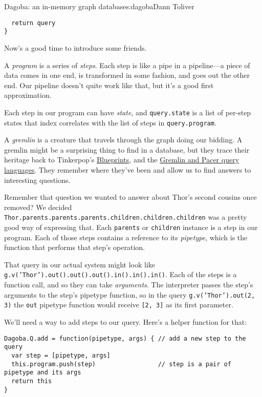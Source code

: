 \begin{aosachapter}{Dagoba: an in-memory graph database}{s:dagoba}{Dann Toliver}
\begin{verbatim}
  return query
}
\end{verbatim}

Now's a good time to introduce some friends.

A \emph{program} is a series of \emph{steps}. Each step is like a pipe
in a pipeline---a piece of data comes in one end, is transformed in some
fashion, and goes out the other end. Our pipeline doesn't quite work
like that, but it's a good first approximation.

Each step in our program can have \emph{state}, and \texttt{query.state}
is a list of per-step states that index correlates with the list of
steps in \texttt{query.program}.

A \emph{gremlin} is a creature that travels through the graph doing our
bidding. A gremlin might be a surprising thing to find in a database,
but they trace their heritage back to Tinkerpop's
\href{http://euranova.eu/upl_docs/publications/an-empirical-comparison-of-graph-databases.pdf}{Blueprints},
and the
\href{http://edbt.org/Proceedings/2013-Genova/papers/workshops/a29-holzschuher.pdf}{Gremlin
and Pacer query languages}. They remember where they've been and allow
us to find answers to interesting questions.

Remember that question we wanted to answer about Thor's second cousins
once removed? We decided
\texttt{Thor.parents.parents.parents.children.children.children} was a
pretty good way of expressing that. Each \texttt{parents} or
\texttt{children} instance is a step in our program. Each of those steps
contains a reference to its \emph{pipetype}, which is the function that
performs that step's operation.

That query in our actual system might look like
\texttt{g.v('Thor').out().out().out().in().in().in()}. Each of the steps
is a function call, and so they can take \emph{arguments}. The
interpreter passes the step's arguments to the step's pipetype function,
so in the query \texttt{g.v('Thor').out(2, 3)} the \texttt{out} pipetype
function would receive \texttt{{[}2, 3{]}} as its first parameter.

We'll need a way to add steps to our query. Here's a helper function for
that:

\begin{verbatim}
Dagoba.Q.add = function(pipetype, args) { // add a new step to the query
  var step = [pipetype, args]
  this.program.push(step)                 // step is a pair of pipetype and its args
  return this
}
\end{verbatim}


\end{aosachapter}
